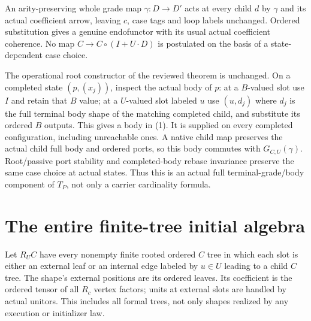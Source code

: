 \documentclass[11pt]{article}
\begin{document}
An arity-preserving whole grade map $\gamma:D\to D'$ acts at every child $d$ by $\gamma$ and its actual coefficient arrow, leaving $c$, case tags and loop labels unchanged. Ordered substitution gives a genuine endofunctor with its usual actual coefficient coherence. No map $C\to C\circ(I+U\cdot D)$ is postulated on the basis of a state-dependent case choice.

The operational root constructor of the reviewed theorem is unchanged. On a completed state $(p,(x_j))$, inspect the actual body of $p$: at a $B$-valued slot use $I$ and retain that $B$ value; at a $U$-valued slot labeled $u$ use $(u,d_j)$ where $d_j$ is the full terminal body shape of the matching completed child, and substitute its ordered $B$ outputs. This gives a body in (1). It is supplied on every completed configuration, including unreachable ones. A native child map preserves the actual child full body and ordered ports, so this body commutes with $G_{C,U}(\gamma)$. Root/passive port stability and completed-body rebase invariance preserve the same case choice at actual states. Thus this is an actual full terminal-grade/body component of $T_P$, not only a carrier cardinality formula.

\section{The entire finite-tree initial algebra}
Let $R_UC$ have every nonempty finite rooted ordered $C$ tree in which each slot is either an external leaf or an internal edge labeled by $u\in U$ leading to a child $C$ tree. The shape's external positions are its ordered leaves. Its coefficient is the ordered tensor of all $R_c$ vertex factors; units at external slots are handled by actual unitors. This includes all formal trees, not only shapes realized by any execution or initializer law.
\end{document}
